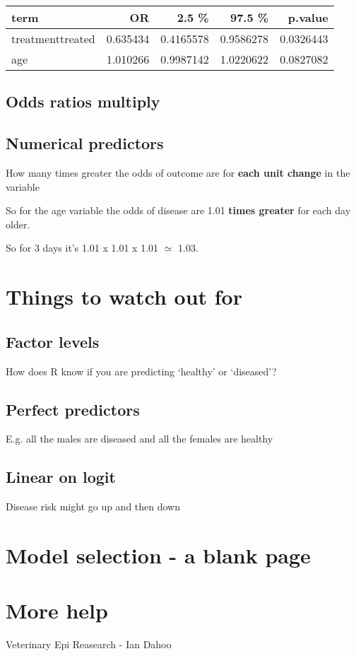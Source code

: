 \documentclass[]{tufte-handout}
\begin{document}
\begin{tabular}{l|r|r|r|r}
\hline
term & OR & 2.5 \% & 97.5 \% & p.value\\
\hline
treatmenttreated & 0.635434 & 0.4165578 & 0.9586278 & 0.0326443\\
\hline
age & 1.010266 & 0.9987142 & 1.0220622 & 0.0827082\\
\hline
\end{tabular}

\hypertarget{odds-ratios-multiply-1}{%
\subsection{\texorpdfstring{Odds ratios
\textbf{multiply}}{Odds ratios multiply}}\label{odds-ratios-multiply-1}}

\hypertarget{numerical-predictors}{%
\subsection{Numerical predictors}\label{numerical-predictors}}

How many times greater the odds of outcome are for \textbf{each unit
change} in the variable

So for the age variable the odds of disease are 1.01 \textbf{times
greater} for each day older.

So for 3 days it's 1.01 x 1.01 x 1.01 \(\simeq\) 1.03.

\hypertarget{things-to-watch-out-for}{%
\section{Things to watch out for}\label{things-to-watch-out-for}}

\hypertarget{factor-levels}{%
\subsection{Factor levels}\label{factor-levels}}

How does R know if you are predicting `healthy' or `diseased'?

\hypertarget{perfect-predictors}{%
\subsection{Perfect predictors}\label{perfect-predictors}}

E.g. all the males are diseased and all the females are healthy

\hypertarget{linear-on-logit}{%
\subsection{Linear on logit}\label{linear-on-logit}}

Disease risk might go up and then down

\hypertarget{model-selection---a-blank-page}{%
\section{Model selection - a blank
page}\label{model-selection---a-blank-page}}

\hypertarget{more-help}{%
\section{More help}\label{more-help}}

Veterinary Epi Reasearch - Ian Dahoo
\end{document}
